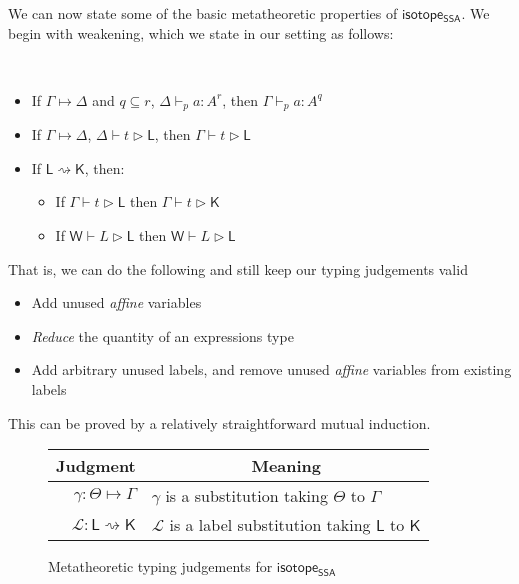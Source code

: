 \documentclass[acmsmall,screen,review]{acmart}
\newcommand{\mc}[1]{\ensuremath{\mathcal{#1}}}
\newcommand{\ms}[1]{\ensuremath{\mathsf{#1}}}
\newcommand{\cwk}[2]{#1 \mapsto #2}
\newcommand{\lwk}[2]{#1 \rightsquigarrow #2}
\newcommand{\hasty}[5]{#1 \vdash_{#2} #3: {#4}^{#5}}
\newcommand{\haslb}[3]{#1 \vdash #2 \rhd #3}
\newcommand{\lhaslb}[3]{#1 \vdash #2 \rhd #3}
\newcommand{\issubst}[3]{#1: #2 \mapsto #3}
\newcommand{\lbsubst}[3]{#1: #2 \rightsquigarrow #3}
\newcommand{\mhole}[1]{{#1}^?}
\newcommand{\mhasty}[6]{#1;#2 \vdash_{#3} #4: {#5}^{#6}}
\newcommand{\mhaslb}[4]{#1;#2 \vdash #3 \rhd #4}
\newcommand{\mlhaslb}[4]{#1;#2 \vdash #3 \rhd #4}
\newcommand{\isrw}[3]{#1: #2 \mapsto #3}
\newcommand{\isotopessa}{\ms{isotope_{SSA}}}
\begin{document}
We can now state some of the basic metatheoretic properties of \isotopessa. We
begin with weakening, which we state in our setting as follows:
\begin{lemma}[Weakening] \
  \begin{itemize}
    \item If \(\cwk{\Gamma}{\Delta}\) and \(q \subseteq r\),
    \(\hasty{\Delta}{p}{a}{A}{r}\), then \(\hasty{\Gamma}{p}{a}{A}{q}\)
    \item If \(\cwk{\Gamma}{\Delta}\), \(\haslb{\Delta}{t}{\ms{L}}\), then \(\haslb{\Gamma}{t}{\ms{L}}\)
    \item If \(\lwk{\ms{L}}{\ms{K}}\), then:
    \begin{itemize}
      \item If \(\haslb{\Gamma}{t}{\ms{L}}\) then \(\haslb{\Gamma}{t}{\ms{K}}\)
      \item If \(\lhaslb{\ms{W}}{L}{\ms{L}}\) then \(\lhaslb{\ms{W}}{L}{\ms{L}}\)
    \end{itemize}
  \end{itemize}
\end{lemma}
That is, we can do the following and still keep our typing judgements valid
\begin{itemize}
  \item Add unused \textit{affine} variables
  \item \textit{Reduce} the quantity of an expressions type
  \item Add arbitrary unused labels, and remove unused \textit{affine} variables
  from existing labels
\end{itemize}
This can be proved by a relatively straightforward mutual induction.

\begin{figure}
  \begin{center}        
    \begingroup
    \renewcommand{\arraystretch}{1.5}
    \setlength{\tabcolsep}{2em}
    \begin{tabular}{rl}
        \multicolumn{1}{c}{Judgment} & \multicolumn{1}{c}{Meaning} \\ \hline
        \(\issubst{\gamma}{\Theta}{\Gamma}\) &
        \(\gamma\) is a substitution taking \(\Theta\) to \(\Gamma\) \\
        \(\lbsubst{\mc{L}}{\ms{L}}{\ms{K}}\) &
        \(\mc{L}\) is a label substitution taking \(\ms{L}\) to \(\ms{K}\) \\
    \end{tabular}
    \endgroup
  \end{center}
  \caption{Metatheoretic typing judgements for \isotopessa}
  \label{fig:ssa-meta-judgements}
\end{figure}
\end{document}
